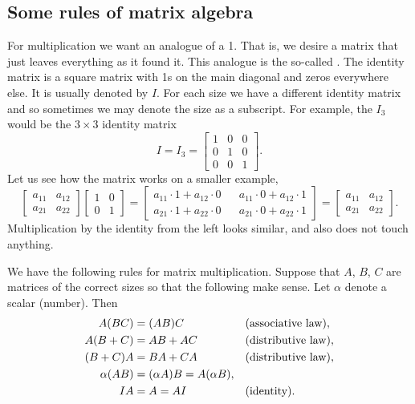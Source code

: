 \documentclass{ximera}
\begin{document}
\subsection{Some rules of matrix algebra}

For multiplication we want an analogue of a 1. That is, we desire a matrix that just leaves everything as it found it. This analogue is the so-called \emph{}. The identity matrix is a square matrix with 1s on the main diagonal and zeros everywhere else.  It is usually denoted by $I$. For each size we have a different identity matrix and so sometimes we may denote the size as a subscript.  For example, the $I_3$ would be the $3 \times 3$ identity matrix
\begin{equation*}
    I = I_3 =
    \begin{bmatrix}
        1 & 0 & 0 \\
        0 & 1 & 0 \\
        0 & 0 & 1
    \end{bmatrix} .
\end{equation*}
Let us see how the matrix works on a smaller example,
\begin{equation*}
    \begin{bmatrix}
        a_{11} & a_{12} \\
        a_{21} & a_{22} 
    \end{bmatrix}
    \begin{bmatrix}
        1 & 0 \\
        0 & 1
    \end{bmatrix} =
    \begin{bmatrix}
        a_{11} \cdot 1 + a_{12} \cdot 0 & & a_{11} \cdot 0 + a_{12} \cdot 1 \\
        a_{21} \cdot 1 + a_{22} \cdot 0 & & a_{21} \cdot 0 + a_{22} \cdot 1
    \end{bmatrix}
    =
    \begin{bmatrix}
        a_{11} & a_{12} \\
        a_{21} & a_{22} 
    \end{bmatrix} .
\end{equation*}
Multiplication by the identity from the left looks similar, and also does not touch anything.

We have the following rules for matrix multiplication.  Suppose that $A$, $B$, $C$ are matrices of the correct sizes so that the following make sense.  Let $\alpha$ denote a scalar (number).  Then
\begin{align*}
    A(BC) & = (AB)C & & \text{(associative law)} , \\
    A(B+C) & = AB + AC & & \text{(distributive law)} , \\
    (B+C)A & = BA + CA & & \text{(distributive law)} , \\
    \alpha(AB) & = (\alpha A)B = A(\alpha B) , & &  \\
    IA & = A = AI & & \text{(identity)}.
\end{align*}
\end{document}
